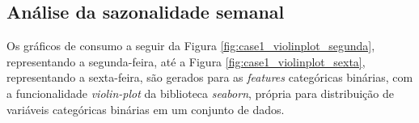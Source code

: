                 \begin{figure}[H]
                \end{figure}
             
            
    	    \subsection{Análise da sazonalidade semanal}
    	        Os gráficos de consumo a seguir da Figura \ref{fig:case1_violinplot_segunda}, representando a segunda-feira,  até a Figura \ref{fig:case1_violinplot_sexta}, representando a sexta-feira, são gerados para as \textit{features} categóricas binárias, com a funcionalidade \textit{violin-plot} da biblioteca \textit{seaborn}, própria para distribuição de variáveis  categóricas binárias em um conjunto de dados.
    	        
